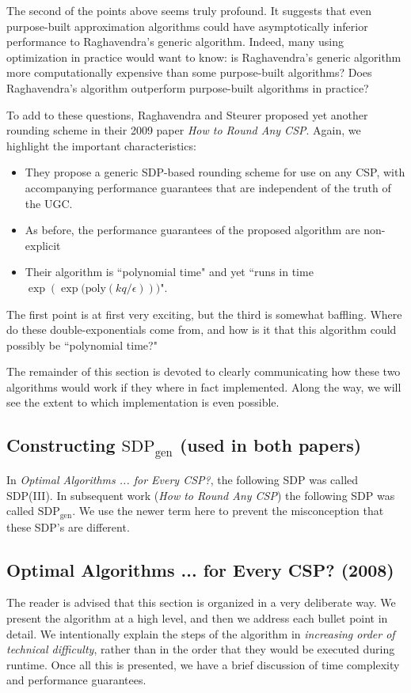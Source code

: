 The second of the points above seems truly profound. It suggests that even purpose-built approximation algorithms could have asymptotically inferior performance to Raghavendra's generic algorithm. Indeed, many using optimization in practice would want to know: is Raghavendra's generic algorithm more computationally expensive than some purpose-built algorithms? Does Raghavendra's algorithm outperform purpose-built algorithms in practice? 

To add to these questions, Raghavendra and Steurer proposed yet another rounding scheme in their 2009 paper \textit{How to Round Any CSP}. Again, we highlight the important characteristics:

\begin{itemize}
\item They propose a generic SDP-based rounding scheme for use on any CSP, with accompanying performance guarantees that are independent of the truth of the UGC.
\item As before, the performance guarantees of the proposed algorithm are non-explicit
\item Their algorithm is ``polynomial time" and yet ``runs in time $\exp{(\exp{(\text{poly}(kq/\epsilon)}))}$".
\end{itemize}

The first point is at first very exciting, but the third is somewhat baffling. Where do these double-exponentials come from, and how is it that this algorithm could possibly be ``polynomial time?"

The remainder of this section is devoted to clearly communicating how these two algorithms would work if they where in fact implemented. Along the way, we will see the extent to which implementation is even possible.
\subsection{Constructing $\text{SDP}_{\text{gen}}$ (used in both papers)}
In \textit{Optimal Algorithms ... for Every CSP?}, the following SDP was called SDP(III). In subsequent work (\textit{How to Round Any CSP}) the following SDP was called $\text{SDP}_{\text{gen}}$. We use the newer term here to prevent the misconception that these SDP's are different.

\subsection{Optimal Algorithms ... for Every CSP? (2008)}
The reader is advised that this section is organized in a very deliberate way. We present the algorithm at a high level, and then we address each bullet point in detail. We intentionally explain the steps of the algorithm in \textit{increasing order of technical difficulty}, rather than in the order that they would be executed during runtime. Once all this is presented, we have a brief discussion of time complexity and performance guarantees.

